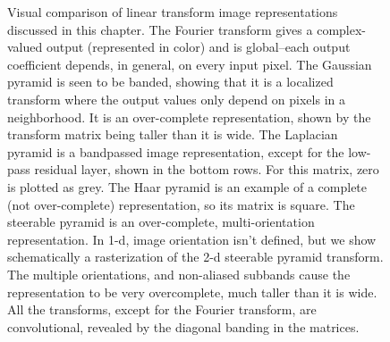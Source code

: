 \begin{figure}
	\centerline{
	}
	\caption{Visual comparison of linear transform image representations
		discussed in this chapter.  The Fourier transform gives a
		complex-valued output (represented in color) and is global--each
		output coefficient depends, in general, on every input pixel.  The
		Gaussian pyramid is seen to be banded, showing that it is a
		localized transform where the output values only depend on pixels in
		a neighborhood.  It is an over-complete representation, shown by the
		transform matrix being taller than it is wide.
		The Laplacian pyramid
		is a bandpassed image representation, except for the low-pass residual
		layer, shown in the bottom rows. For this matrix, zero is plotted as
		grey.  The Haar pyramid is an example of a complete (not
		over-complete) representation, so its matrix is square.  The steerable
		pyramid is an over-complete, multi-orientation representation.  In 1-d, image orientation
		isn't defined, but we show schematically a rasterization of the 2-d
		steerable pyramid transform.  The multiple orientations, and
		non-aliased subbands cause the representation to be very overcomplete,
		much taller than it is wide.
		All the transforms,
		except for the Fourier transform, are convolutional, revealed by the
		diagonal banding in the matrices.
	}
	\label{fig:steerpyr}
\end{figure}










